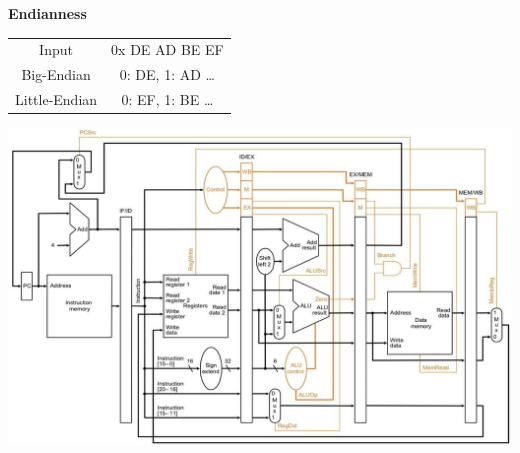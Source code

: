 \documentclass[a4paper]{article} \usepackage[backend=biber, style=numeric, sorting=none]{biblatex}
\newenvironment{Figure}
  {\par\medskip\noindent\minipage{\linewidth}}
  {\endminipage\par\medskip}
\begin{document}
\begin{multicols*}{4}
{\small\textbf{Endianness\\}}
\begin{tabular}{ |c c| }
 \hline
 Input & 0x DE AD BE EF  \\
 Big-Endian & 0: DE, 1: AD \dots  \\
 Little-Endian & 0: EF, 1: BE \dots  \\
 \hline
\end{tabular}
\vfill\null
\columnbreak
\begin{Figure}
 \centering
 \includegraphics[angle=90, scale=0.25]{full_datapath_with_controls.jpg}
\end{Figure}
\end{multicols*}
\end{document}
